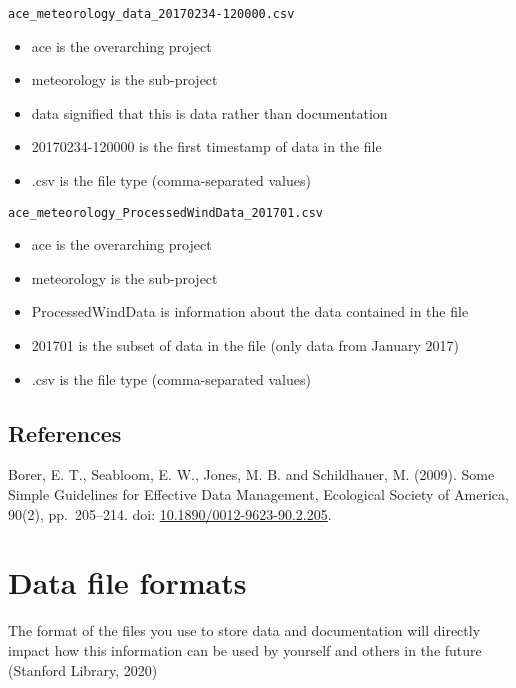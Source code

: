 \documentclass[a4paper,oneside]{report}
\providecommand{\tightlist}{%
  \setlength{\itemsep}{0pt}\setlength{\parskip}{0pt}}
\begin{document}
\begin{verbatim}
ace_meteorology_data_20170234-120000.csv
\end{verbatim}

\begin{itemize}
\tightlist
\item
  ace is the overarching project
\item
  meteorology is the sub-project
\item
  data signified that this is data rather than documentation
\item
  20170234-120000 is the first timestamp of data in the file
\item
  .csv is the file type (comma-separated values)
\end{itemize}

\begin{verbatim}
ace_meteorology_ProcessedWindData_201701.csv
\end{verbatim}

\begin{itemize}
\tightlist
\item
  ace is the overarching project
\item
  meteorology is the sub-project
\item
  ProcessedWindData is information about the data contained in the file
\item
  201701 is the subset of data in the file (only data from January 2017)
\item
  .csv is the file type (comma-separated values)
\end{itemize}

\hypertarget{references-2}{%
\section{References}\label{references-2}}

Borer, E. T., Seabloom, E. W., Jones, M. B. and Schildhauer, M. (2009).
Some Simple Guidelines for Effective Data Management, Ecological Society
of America, 90(2), pp.~205--214. doi:
\href{https://doi.org/10.1890/0012-9623-90.2.205}{10.1890/0012-9623-90.2.205}.

\hypertarget{data-file-formats}{%
\chapter{Data file formats}\label{data-file-formats}}

The format of the files you use to store data and documentation will
directly impact how this information can be used by yourself and others
in the future (Stanford Library, 2020)
\end{document}
